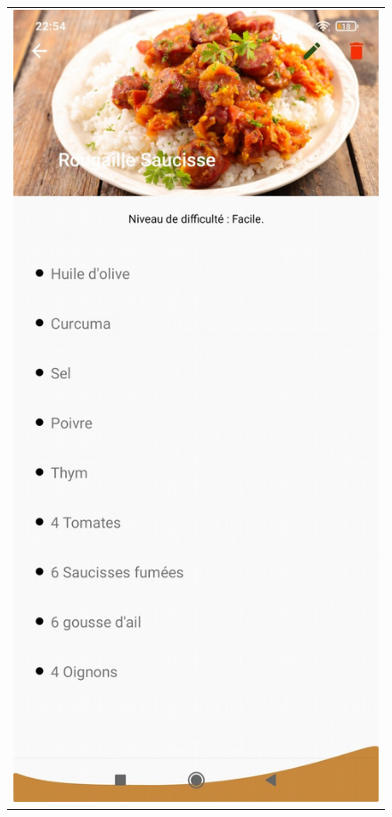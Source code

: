 \documentclass{article}
\begin{document}
\begin{figure}
\begin{tabular}{@{}c@{}}
    \end{tabular}
    \begin{tabular}{@{}c@{}}
        \includegraphics[scale=0.152]{ingrdient.png}

\end{tabular}
\end{figure}
\end{document}
